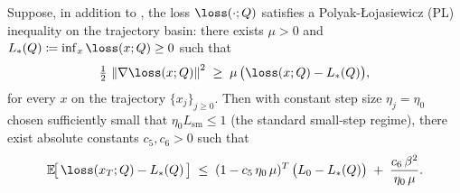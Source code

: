 \begin{corollary}\label{cor:pl_exponential_rate}
Suppose, in addition to
,
the loss $\loss(\cdot; Q)$ satisfies a Polyak-{\L}ojasiewicz (PL)
inequality on the trajectory basin: there exists $\mu > 0$ and
$L_*(Q) \coloneqq \inf_x \loss(x; Q) \ge 0$ such that
\begin{align}\label{eq:pl_inequality}
   \tfrac{1}{2}\, \norm{\nabla \loss(x; Q)}^2
   \;\ge\;
   \mu\, \bigl(\loss(x; Q) - L_*(Q)\bigr),
\end{align}
for every $x$ on the trajectory $\{x_j\}_{j \ge 0}$. Then with constant
step size $\eta_j = \eta_0$ chosen sufficiently small that
$\eta_0 L_{\mathrm{sm}} \le 1$ (the standard small-step regime), there
exist absolute constants $c_5, c_6 > 0$ such that
\begin{align}\label{eq:pl_exponential_rate}
   \E\!\bigl[\, \loss(x_T; Q) - L_*(Q) \,\bigr]
   \;\le\;
   (1 - c_5\, \eta_0\, \mu)^T\, \bigl(L_0 - L_*(Q)\bigr)
   \;+\; \frac{c_6\, \beta^2}{\eta_0\, \mu}.
\end{align}
\end{corollary}

